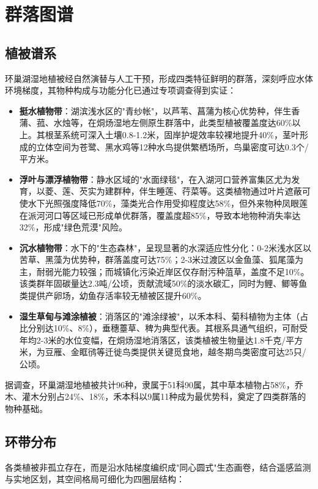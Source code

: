 
\section{群落图谱}

\subsection{植被谱系}
环巢湖湿地植被经自然演替与人工干预，形成四类特征鲜明的群落，深刻呼应水体环境梯度，其物种构成与功能分化已通过专项调查得到实证：

\begin{itemize}
    \item \textbf{挺水植物带}：湖滨浅水区的"青纱帐"，以芦苇、菖蒲为核心优势种，伴生香蒲、菰、水烛等，在烔炀湿地左侧原生群落中，此类型植被覆盖度达60\%以上。其根茎系统可深入土壤0.8-1.2米，固岸护堤效率较裸地提升40\%，茎叶形成的立体空间为苍鹭、黑水鸡等12种水鸟提供繁栖场所，鸟巢密度可达0.3个/平方米。

    \item \textbf{浮叶与漂浮植物带}：静水区域的"水面绿毯"，在入湖河口营养富集区尤为发育，以菱、莲、芡实为建群种，伴生睡莲、荇菜等。这类植物通过叶片遮蔽可使水下光照强度降低70\%，藻类光合作用受抑程度达58\%，但外来物种凤眼莲在派河河口等区域已形成单优群落，覆盖度超85\%，导致本地物种消失率达32\%，形成"绿色荒漠"风险。

    \item \textbf{沉水植物带}：水下的"生态森林"，呈现显著的水深适应性分化：0-2米浅水区以苦草、黑藻为优势种，群落盖度可达75\%；2-3米过渡区以金鱼藻、狐尾藻为主，耐弱光能力较强；而城镇化污染近岸区仅存耐污种菹草，盖度不足10\%。该类群年固碳量达2.3吨/公顷，贡献流域50\%的淡水碳汇，同时为鲤、鲫等鱼类提供产卵场，幼鱼存活率较无植被区提升60\%。

    \item \textbf{湿生草甸与滩涂植被}：消落区的"滩涂绿被"，以禾本科、菊科植物为主体（占比分别达10\%、8\%），垂穗薹草、稗为典型代表。其根系具通气组织，可耐受年均2-3米的水位变幅，在烔炀湿地消落区，该类植被生物量达1.8千克/平方米，为豆雁、金眶鸻等迁徙鸟类提供关键觅食地，越冬期鸟类密度可达25只/公顷。
\end{itemize}

据调查，环巢湖湿地植被共计96种，隶属于51科90属，其中草本植物占58\%，乔木、灌木分别占24\%、18\%，禾本科以9属11种成为最优势科，奠定了四类群落的物种基础。

\subsection{环带分布}
各类植被非孤立存在，而是沿水陆梯度编织成"同心圆式"生态画卷，结合遥感监测与实地区划，其空间格局可细化为四圈层结构：

